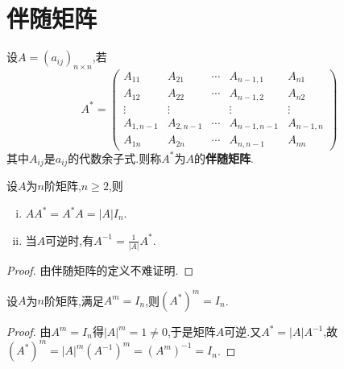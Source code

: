 \documentclass[lang=cn,newtx,10pt,scheme=chinese]{elegantbook}
\begin{document}
\section{伴随矩阵}

\begin{definition}[伴随矩阵定义]\label{definition:伴随矩阵定义}
设$A=(a_{ij})_{n\times n}$,若
\[
A^* = 
\begin{pmatrix}
A_{11} & A_{21} & \cdots & A_{n - 1,1} & A_{n1} \\
A_{12} & A_{22} & \cdots & A_{n - 1,2} & A_{n2} \\
\vdots & \vdots & & \vdots & \vdots \\
A_{1,n - 1} & A_{2,n - 1} & \cdots & A_{n - 1,n - 1} & A_{n - 1,n} \\
A_{1n} & A_{2n} & \cdots & A_{n,n - 1} & A_{nn}
\end{pmatrix}
\]
其中\(A_{ij}\)是\(a_{ij}\)的代数余子式.则称\(A^*\)为\(A\)的\textbf{伴随矩阵}.
\end{definition}

\begin{theorem}\label{theorem:伴随矩阵的基本性质}
    设$A$为$n$阶矩阵,$n\geq 2$,则
\begin{enumerate}[(i)]
    \item $AA^*=A^*A=\left| A \right|I_n$.
    \item\label{伴随矩阵基本性质2} 当$A$可逆时,有$A^{-1}=\frac{1}{\left| A \right|}A^*$.
\end{enumerate}
\end{theorem}
\begin{proof}
    由伴随矩阵的定义不难证明.
\end{proof}

\begin{proposition}
    设\(A\)为\(n\)阶矩阵,满足\(A^m = I_n\),则\((A^*)^m = I_n\).
\end{proposition}
\begin{proof}
    由\(A^m = I_n\)得\(|A|^m = 1\ne 0\),于是矩阵$A$可逆.又\(A^* = |A|A^{-1}\),故$(A^*)^m = |A|^m(A^{-1})^m = (A^m)^{-1} = I_n$.
\end{proof}
\end{document}
